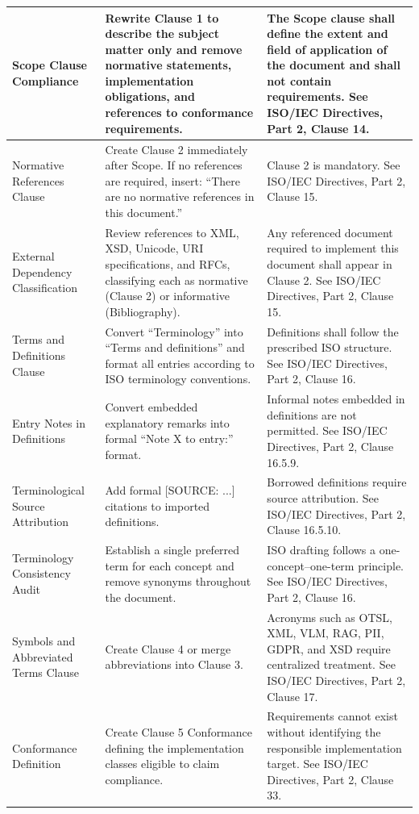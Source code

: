 \documentclass[11pt,a4paper]{article}
\begin{document}
\begin{table}[h]
\begin{tabular}{|l|l|l|}
Scope Clause Compliance & Rewrite Clause 1 to describe the subject matter only and remove normative statements, implementation obligations, and references to conformance requirements. & The Scope clause shall define the extent and field of application of the document and shall not contain requirements. See ISO/IEC Directives, Part 2, Clause 14. \\ \hline
Normative References Clause & Create Clause 2 immediately after Scope. If no references are required, insert: “There are no normative references in this document.” & Clause 2 is mandatory. See ISO/IEC Directives, Part 2, Clause 15. \\ \hline
External Dependency Classification & Review references to XML, XSD, Unicode, URI specifications, and RFCs, classifying each as normative (Clause 2) or informative (Bibliography). & Any referenced document required to implement this document shall appear in Clause 2. See ISO/IEC Directives, Part 2, Clause 15. \\ \hline
Terms and Definitions Clause & Convert “Terminology” into “Terms and definitions” and format all entries according to ISO terminology conventions. & Definitions shall follow the prescribed ISO structure. See ISO/IEC Directives, Part 2, Clause 16. \\ \hline
Entry Notes in Definitions & Convert embedded explanatory remarks into formal “Note X to entry:” format. & Informal notes embedded in definitions are not permitted. See ISO/IEC Directives, Part 2, Clause 16.5.9. \\ \hline
Terminological Source Attribution & Add formal [SOURCE: ...] citations to imported definitions. & Borrowed definitions require source attribution. See ISO/IEC Directives, Part 2, Clause 16.5.10. \\ \hline
Terminology Consistency Audit & Establish a single preferred term for each concept and remove synonyms throughout the document. & ISO drafting follows a one-concept–one-term principle. See ISO/IEC Directives, Part 2, Clause 16. \\ \hline
Symbols and Abbreviated Terms Clause & Create Clause 4 or merge abbreviations into Clause 3. & Acronyms such as OTSL, XML, VLM, RAG, PII, GDPR, and XSD require centralized treatment. See ISO/IEC Directives, Part 2, Clause 17. \\ \hline
Conformance Definition & Create Clause 5 Conformance defining the implementation classes eligible to claim compliance. & Requirements cannot exist without identifying the responsible implementation target. See ISO/IEC Directives, Part 2, Clause 33. \\ \hline

\end{tabular}
\end{table}
\end{document}

